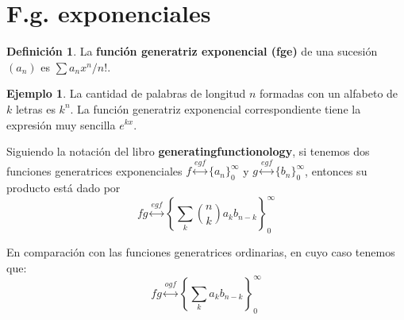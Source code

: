 \documentclass[spanish]{book}
\theoremstyle{definition}
\newtheorem*{defn}{Definición}
\newtheorem*{ejem}{Ejemplo}
\begin{document}
\section{F.g. exponenciales}
\begin{defn}
	La \textbf{función generatriz exponencial (fge)} de una sucesión $(a_n)$ es $\sum a_{n}x^{n}/n!$.
\end{defn}
\begin{ejem}
	La cantidad de palabras de longitud $n$ formadas con un alfabeto de $k$ letras es $k^n$. La función generatriz exponencial correspondiente tiene la expresión muy sencilla $e^{kx}$.
\end{ejem}
\begin{teo}\label{rule3p}
	Siguiendo la notación del libro \textbf{generatingfunctionology}, si tenemos dos funciones generatrices exponenciales $f\overset{egf}{\longleftrightarrow}\{a_n\}_0^\infty$ y $g\overset{egf}{\longleftrightarrow}\{b_n\}_0^\infty$, entonces su producto está dado por
	\[fg\overset{egf}{\longleftrightarrow}\left\{\sum_k{n\choose k}a_kb_{n-k}\right\}_0^\infty\]
\end{teo}
	En comparación con las funciones generatrices ordinarias, en cuyo caso tenemos que:
		\[fg\overset{ogf}{\longleftrightarrow}\left\{\sum_ka_kb_{n-k}\right\}_0^\infty\]
		
\end{document}

